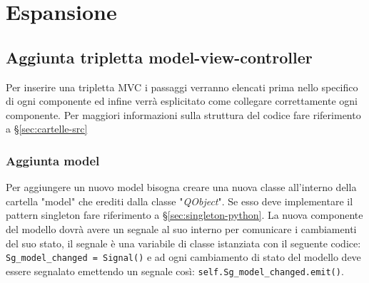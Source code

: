 \section{Espansione}

\subsection{Aggiunta tripletta model-view-controller} \label{sec:aggiuntamvc}
Per inserire una tripletta MVC i passaggi verranno elencati prima nello specifico di ogni componente ed infine verrà esplicitato come collegare correttamente ogni componente. Per maggiori informazioni sulla struttura del codice fare riferimento a \S{}\ref{sec:cartelle-src}

\subsubsection{Aggiunta model}
Per aggiungere un nuovo model bisogna creare una nuova classe all'interno della cartella "model" che erediti dalla classe "\textit{QObject}". Se esso deve implementare il pattern singleton fare riferimento a \S{}\ref{sec:singleton-python}. La nuova componente del modello dovrà avere un segnale al suo interno per comunicare i cambiamenti del suo stato, il segnale è una variabile di classe istanziata con il seguente codice: \texttt{Sg\_model\_changed = Signal()} e ad ogni cambiamento di stato del modello deve essere segnalato emettendo un segnale così: \texttt{self.Sg\_model\_changed.emit()}.


